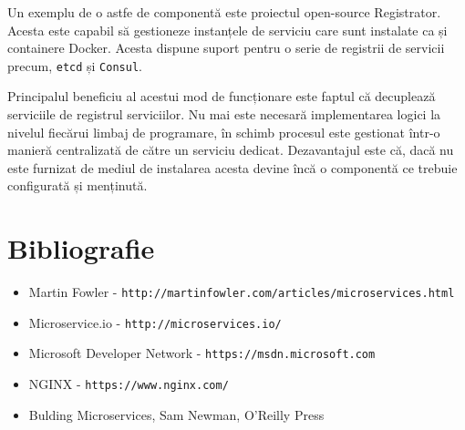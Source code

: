 \documentclass[12pt, a4paper, oneside, romanian]{teza-upb}
\begin{document}
Un exemplu de o astfe de componentă este proiectul open-source Registrator. Acesta este capabil să gestioneze instanțele de serviciu care sunt instalate ca și containere Docker. Acesta dispune suport pentru o serie de registrii de servicii precum, \texttt{etcd} și \texttt{Consul}.

Principalul beneficiu al acestui mod de funcționare este faptul că decuplează serviciile de registrul serviciilor. Nu mai este necesară implementarea logici la nivelul fiecărui limbaj de programare, în schimb procesul este gestionat într-o manieră centralizată de către un serviciu dedicat. Dezavantajul este că, dacă nu este furnizat de mediul de instalarea acesta devine încă o componentă ce trebuie configurată și menținută. 



\chapter{Bibliografie}

\begin{itemize}
 \item Martin Fowler - \texttt{http://martinfowler.com/articles/microservices.html}
 \item Microservice.io - \texttt{http://microservices.io/}
 \item Microsoft Developer Network - \texttt{https://msdn.microsoft.com}
 \item NGINX - \texttt{https://www.nginx.com/}
 \item Bulding Microservices, Sam Newman, O'Reilly Press
\end{itemize}	
\end{document}
